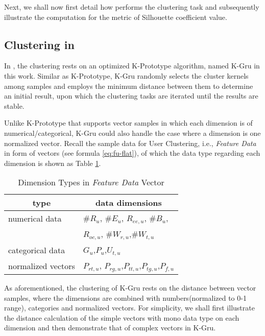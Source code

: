 Next, we shall now first detail how \sys{} performs the clustering task and subsequently illustrate the computation for the metric of Silhouette coefficient value.

\subsection{Clustering in \sys{}}
\label{sec:cluster}

In \sys{}, the clustering rests on an optimized K-Prototype \cite{IEEEexample:huang1997clustering} algorithm, named K-Gru in this work.
Similar as K-Prototype, K-Gru randomly selects the cluster kernels among samples and employs the minimum distance between them to determine an initial result, upon which the clustering tasks are iterated until the results are stable.

Unlike K-Prototype that supports vector samples in which each dimension is of numerical/categorical, K-Gru could also handle the case where a dimension is one normalized vector.
%
Recall the sample data for User Clustering, i.e., \textit{Feature Data} in form of vectors (see formula \ref{eq:fu-flat}), of which the data type regarding each dimension is shown as Table \ref{tbl:data-type}.

\begin{table}[!htb]
\centering
\begin{small}
\caption{Dimension Types in \textit{Feature Data} Vector}
\vspace{0.3cm}
\label{tbl:data-type}
\begin{tabular}{ll}
\toprule
\multicolumn{1}{c}{\textbf{type}} & \multicolumn{1}{c}{\textbf{data dimensions}}	\\	\midrule \midrule
numerical data				& $\#R_u$, $\#E_u$, $R_{ee,u}$, $\#B_u$,\\
                            &  $R_{oc,u}$, $\#W_{r,u}$,$\#W_{t,u}$				\\	\midrule
categorical data			& $G_u$,$P_u$,$U_{t,u}$				\\	\midrule
normalized vectors			& $P_{rt,u}$, $P_{rg,u}$,$P_{tt,u}$,$P_{tg,u}$,$P_{f,u}$			\\ \bottomrule
\end{tabular}
\end{small}
\end{table}

As aforementioned, the clustering of K-Gru rests on the distance between vector samples, where the dimensions are combined with numbers(normalized to 0-1 range), categories and normalized vectors.
For simplicity, we shall first illustrate the distance calculation of the simple vectors with mono data type on each dimension and then demonstrate that of complex vectors in K-Gru.

